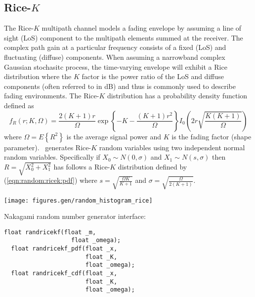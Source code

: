 %
%
\subsection{Rice-$K$}
\label{module:random:ricek}
The Rice-$K$ multipath
channel models a fading envelope by assuming a line of sight (LoS)
component to the multipath elements summed at the receiver.
The complex path gain at a particular frequency consists of a fixed
(LoS) and fluctuating (diffuse) components.
When assuming a narrowband complex Gaussian stochasitc process, the
time-varying envelope will exhibit a Rice distribution where the $K$
factor is the power ratio of the LoS and diffuse components (often
referred to in dB) and thus is commonly used to describe fading
environments.
%
The Rice-$K$ distribution has a probability density function defined as
%
\begin{equation}
\label{eqn:random:ricek:pdf}
    f_R(r;K,\Omega) = 
        \frac{2(K+1)r}{\Omega}
        \exp\left\{-K-\frac{(K+1)r^2}{\Omega}\right\}
        I_0\left( 2r\sqrt{\frac{K(K+1)}{\Omega}} \right)
\end{equation}
%
where $\Omega=E\left\{R^2\right\}$ is the average signal power and $K$
is the fading factor (shape parameter).
\liquid\ generates Rice-$K$ random variables using two independent
normal random variables.
Specifically if
$X_0 \sim N(0,\sigma)$
and
$X_1 \sim N(s,\sigma)$
then
$R = \sqrt{X_0^2 + X_1^2}$
has follows a Rice-$K$ distribution defined by
(\ref{eqn:random:ricek:pdf})
where
$s      = \sqrt{\frac{\Omega K}{K+1}}$
and
$\sigma = \sqrt{\frac{\Omega}{2(K+1)}}$.


\begin{minipage}{0.5\textwidth}
  \texttt{[image: figures.gen/random\_histogram\_rice]}
\end{minipage}
\begin{minipage}{0.5\textwidth}
  Nakagami random number generator interface:
  \begin{Verbatim}[fontsize=\small]
  float randricekf(float _m,
                   float _omega);
  float randricekf_pdf(float _x,
                       float _K,
                       float _omega);
  float randricekf_cdf(float _x,
                       float _K,
                       float _omega);
  \end{Verbatim}
\end{minipage}


% 
%
